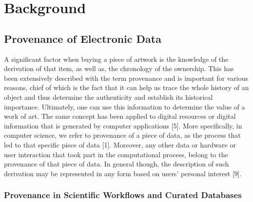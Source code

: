 
\chapter{Background} %
\label{Background}


\section{Provenance of Electronic Data}

A significant factor when buying a piece of artwork is the knowledge of the derivation of that item, as well as, the chronology of the ownership. This has been extensively described with the term provenance and is important for various reasons, chief of which is the fact that it can help us trace the whole history of an object and thus determine the authenticity and establish its historical importance.  Ultimately, one can use this information to determine the value of a work of art.
The same concept has been applied to digital resources or digital information that is generated by computer applications [5]. More specifically, in computer science, we refer to provenance of a piece of data, as the process that led to that specific piece of data [1]. Moreover, any other data or hardware or user interaction that took part in the computational process, belong to the provenance of that piece of data. In general though, the description of such derivation may be represented in any form based on users' personal interest [9].

\subsection{Provenance in Scientific Workflows and Curated Databases}

